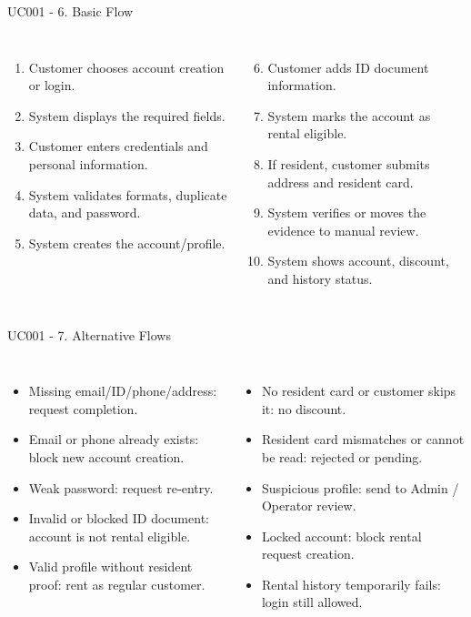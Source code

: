 \documentclass[aspectratio=169,10pt]{beamer}
\newcommand{\tightitems}{\setlength{\itemsep}{2pt}\setlength{\parskip}{0pt}}
\begin{document}
\begin{frame}{UC001 - 6. Basic Flow}
\footnotesize
\begin{columns}[T,onlytextwidth]
\begin{enumerate}\tightitems
  \item Customer chooses account creation or login.
  \item System displays the required fields.
  \item Customer enters credentials and personal information.
  \item System validates formats, duplicate data, and password.
  \item System creates the account/profile.
\end{enumerate}
\begin{enumerate}\setcounter{enumi}{5}\tightitems
  \item Customer adds ID document information.
  \item System marks the account as rental eligible.
  \item If resident, customer submits address and resident card.
  \item System verifies or moves the evidence to manual review.
  \item System shows account, discount, and history status.
\end{enumerate}
\end{columns}
\end{frame}

\begin{frame}{UC001 - 7. Alternative Flows}
\footnotesize
\begin{columns}[T,onlytextwidth]
\begin{itemize}\tightitems
  \item Missing email/ID/phone/address: request completion.
  \item Email or phone already exists: block new account creation.
  \item Weak password: request re-entry.
  \item Invalid or blocked ID document: account is not rental eligible.
  \item Valid profile without resident proof: rent as regular customer.
\end{itemize}
\begin{itemize}\tightitems
  \item No resident card or customer skips it: no discount.
  \item Resident card mismatches or cannot be read: rejected or pending.
  \item Suspicious profile: send to Admin / Operator review.
  \item Locked account: block rental request creation.
  \item Rental history temporarily fails: login still allowed.
\end{itemize}
\end{columns}
\end{frame}
\end{document}
